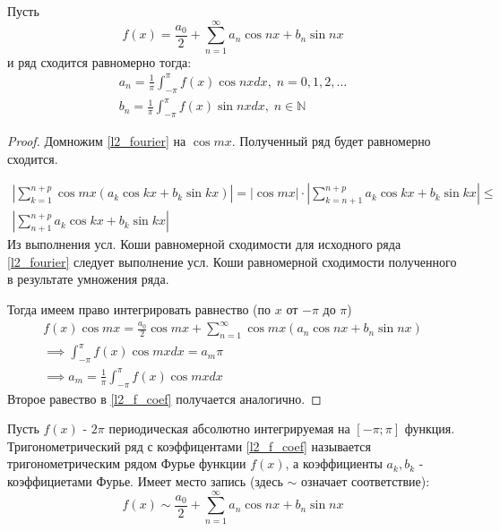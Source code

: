 \documentclass{article}
\begin{document}
\begin{lemma} \label{l2_f_lemma}
  Пусть
  \begin{equation} \label{l2_fourier}
    f(x)=\frac{a_0}{2}+\sum_{n=1}^{\infty}a_n\cos nx+b_n\sin nx
  \end{equation}
  и ряд сходится равномерно тогда:
  \begin{equation}
    \begin{gathered} \label{l2_f_coef}
      a_n=\frac{1}{\pi}\int_{-\pi}^{\pi}f(x)\cos nx dx, \; n=0,1,2,\dots \\ 
      b_n=\frac{1}{\pi}\int_{-\pi}^{\pi}f(x)\sin nx dx, \; n\in\mathbb{N} 
    \end{gathered}
  \end{equation}
\end{lemma}
\begin{proof}
  Домножим \ref{l2_fourier} на $\cos mx$. 
  Полученный ряд будет равномерно сходится.

  \hr
  \begin{gather*}
    \left|\sum_{k=1}^{n+p}\cos mx(a_k\cos kx + b_k \sin kx)\right|= 
    |\cos mx|\cdot\left|\sum_{k=n+1}^{n+p}a_k\cos kx + b_k\sin kx\right| \le  \\
    \left|\sum_{n+1}^{n+p}a_k\cos kx + b_k \sin kx\right|
  \end{gather*}
  Из выполнения усл. Коши равномерной сходимости для исходного ряда \ref{l2_fourier}
  следует выполнение усл. Коши равномерной сходимости полученного в результате умножения ряда.

  \hr
  Тогда имеем право интегрировать равнество (по $x$ от $-\pi$ до $\pi$)
  \begin{gather*}
    f(x)\cos mx = \frac{a_0}{2}\cos mx + \sum_{n=1}^{\infty}\cos mx (a_n \cos nx + b_n \sin nx) \\
    \implies \int_{-\pi}^{\pi}f(x)\cos mx dx = a_m \pi \\ 
    \implies a_m=\frac{1}{\pi}\int_{-\pi}^{\pi}f(x)\cos mx dx
  \end{gather*}
  Второе равество в \ref{l2_f_coef} получается аналогично.
\end{proof}
\begin{definition}
  Пусть $f(x)$ - $2\pi$ периодическая абсолютно интегрируемая на $[-\pi;\pi]$ функция.
  Тригонометрический ряд с коэффицентами \ref{l2_f_coef} называется
  тригонометрическим рядом Фурье функции $f(x)$, а коэффициенты $a_k,b_k$ - коэффициетами Фурье.
  Имеет место запись (здесь $\sim$ означает соответствие):
  \[
    f(x)\sim \frac{a_0}{2}+\sum_{n=1}^{\infty}a_n\cos nx + b_n\sin nx
  \]
\end{definition}
\end{document}
